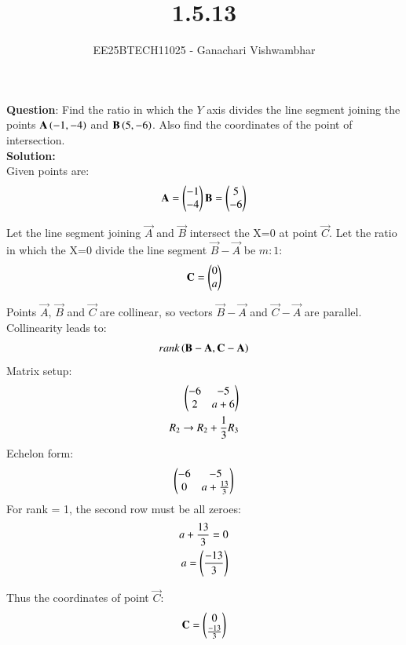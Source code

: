 \documentclass[journal]{IEEEtran}
\begin{document}
\title{1.5.13}
\author{EE25BTECH11025 - Ganachari Vishwambhar}
\maketitle

\textbf{Question}:\newline
Find the ratio in which the $Y$ axis divides the line segment joining the points $\mathbf{A}\left(-1,-4\right)$ and $\mathbf{B}\left(5,-6\right)$. Also find the coordinates of the point of intersection.\\
\textbf{Solution: }\\

Given points are:
\begin{align}
\mathbf{A}=\begin{pmatrix}-1\\-4\end{pmatrix}
\mathbf{B}=\begin{pmatrix}5\\-6\end{pmatrix}
\end{align}

Let the line segment joining $\vec{A}$ and $\vec{B}$ intersect the X=0 at point $\vec{C}$. Let the ratio in which the X=0 divide the line segment $\vec{B}-\vec{A}$ be $m:1$:
\begin{align}
\mathbf{C}=\begin{pmatrix}0\\a\end{pmatrix}
\end{align}

Points $\vec{A}$, $\vec{B}$ and $\vec{C}$ are collinear, so vectors $\vec{B}-\vec{A}$ and $\vec{C}-\vec{A}$ are parallel.\\
Collinearity leads to:
\begin{align}
    rank\left(\mathbf{B}-\mathbf{A},\mathbf{C}-\mathbf{A}\right)
\end{align}
Matrix setup:
\begin{align}
    \begin{pmatrix}-6&-5\\2&a+6\end{pmatrix}\\
    R_2 \rightarrow R_2 + \frac{1}{3}R_3\\
\end{align}
Echelon form:
\begin{align}
    \begin{pmatrix}-6&-5\\0&a+\frac{13}{3}\end{pmatrix}
\end{align}
For rank = 1, the second row must be all zeroes:
\begin{align}
    a+\frac{13}{3}=0\\
    a=\left(\frac{-13}{3}\right)
\end{align}

Thus the coordinates of point $\vec{C}$:
\begin{align}
    \mathbf{C}=\begin{pmatrix}0\\\frac{-13}{3}\end{pmatrix}
\end{align}
\end{document}
